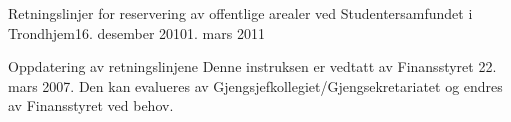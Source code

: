 \begin{instruks}{Retningslinjer for reservering av offentlige arealer
    ved Studentersamfundet i Trondhjem}{16. desember 2010}{1. mars 2011}
    \begin{instruksledd}{Oppdatering av retningslinjene}
        Denne instruksen er vedtatt av Finansstyret 22. mars 2007. Den kan evalueres
        av Gjengsjefkollegiet/Gjengsekretariatet og endres av Finansstyret ved behov.
    \end{instruksledd}

\end{instruks}


